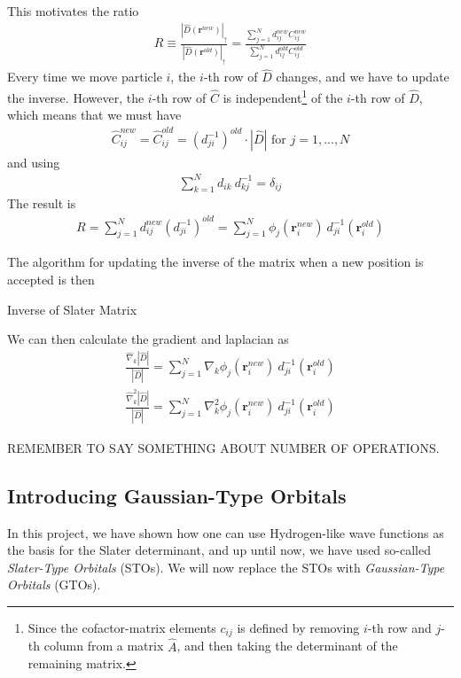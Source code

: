 \documentclass[twocolumns, a4paper,11pt,fleqn]{extarticle}
\newcommand{\eq}[1]{{\small\begin{align*}#1\end{align*}}}
\renewcommand\vec[1]{\boldsymbol{\mathbf{#1}}}
\newcommand{\op}[1]{\hat{#1}}
\begin{document}
This motivates the ratio
\eq{
  R \equiv \frac{|\op D(\vec r^{new})|_{\uparrow}}{|\op D(\vec r^{old})|_{\uparrow}} 
  = \frac{\sum_{j=1}^N d_{ij}^{new} C_{ij}^{new}}
    {\sum_{j=1}^N d_{ij}^{old} C_{ij}^{old}}
}
Every time we move particle $i$, the $i$-th row of $\op D$ changes,
and we have to update the inverse. However, the $i$-th row of $\op C$
is independent\footnote{Since the cofactor-matrix elements $c_{ij}$ is defined by 
removing $i$-th row and $j$-th column from a matrix $\op A$,
and then taking the determinant of the remaining matrix.} 
of the $i$-th row of $\op D$, which means that
we must have
\eq{
  \op C_{ij}^{new} = \op C_{ij}^{old} = (d_{ji}^{-1})^{old}\cdot |\op D| 
    \text{ for } j=1,...,N
}
and using
\eq{
  \sum_{k=1}^N d_{ik}\ d_{kj}^{-1} =\delta_{ij}
}
The result is
\eq{
  R=\sum_{j=1}^N d_{ij}^{new} (d_{ji}^{-1})^{old}
    =\sum_{j=1}^N \phi_j(\vec r_i^{new})\ d_{ji}^{-1} (\vec r_i^{old})
}

The algorithm for updating the inverse of the matrix 
when a new position is accepted is then

\begin{algorithm}
	\caption{Inverse of Slater Matrix}\label{algo1}
  \begin{algorithmic}[1]
      \State{$ S_j = \sum_{l=1}^N d_{il}(\vec r^{new}) d_{lj}^{-1}(\vec r^{old}) $}
    \EndFor
    \EndProcedure
    \EndProcedure
  \end{algorithmic}
\end{algorithm}

We can then calculate the gradient and laplacian as
\eq{
  \frac{\op\nabla_k |\op D|}{|\op D|} 
    = \sum_{j=1}^N \nabla_k \phi_j(\vec r_i^{new})\ d_{ji}^{-1} (\vec r_i^{old})\\
  \frac{\op\nabla_k^2 |\op D|}{|\op D|} 
    = \sum_{j=1}^N \nabla_k^2 \phi_j(\vec r_i^{new})\ d_{ji}^{-1} (\vec r_i^{old})
}

REMEMBER TO SAY SOMETHING ABOUT NUMBER OF OPERATIONS.

\subsection{Introducing Gaussian-Type Orbitals}
In this project, we have shown how one can use Hydrogen-like wave functions as the basis
for the Slater determinant, and up until now, 
we have used so-called \textit{Slater-Type Orbitals} (STOs).
We will now replace the STOs with \textit{Gaussian-Type Orbitals} (GTOs).
\end{document}
